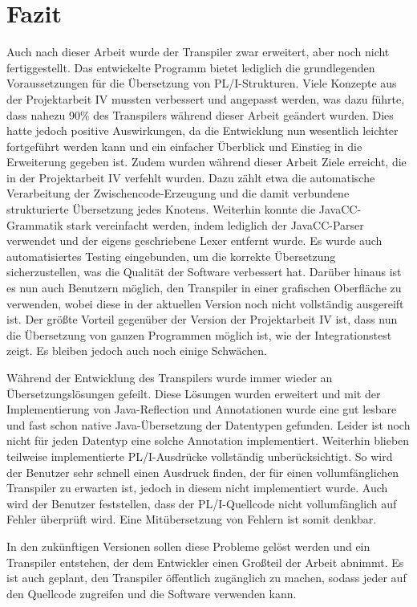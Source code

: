 \section{Fazit}
Auch nach dieser Arbeit wurde der Transpiler zwar erweitert, aber noch nicht fertiggestellt.
Das entwickelte Programm bietet lediglich die grundlegenden Voraussetzungen für die Übersetzung von PL/I-Strukturen.
Viele Konzepte aus der Projektarbeit IV mussten verbessert und angepasst werden, was dazu führte, dass nahezu 90\% des Transpilers
während dieser Arbeit geändert wurden. Dies hatte jedoch positive Auswirkungen, da die Entwicklung nun wesentlich leichter fortgeführt werden kann
und ein einfacher Überblick und Einstieg in die Erweiterung gegeben ist.
Zudem wurden während dieser Arbeit Ziele erreicht, die in der Projektarbeit IV verfehlt wurden. Dazu zählt etwa
die automatische Verarbeitung der Zwischencode-Erzeugung und die damit verbundene strukturierte Übersetzung jedes Knotens.
Weiterhin konnte die JavaCC-Grammatik stark vereinfacht werden, indem lediglich der JavaCC-Parser verwendet und der eigens geschriebene
Lexer entfernt wurde.
Es wurde auch automatisiertes Testing eingebunden, um die korrekte Übersetzung sicherzustellen, was die Qualität der Software verbessert hat.
Darüber hinaus ist es nun auch Benutzern möglich, den Transpiler in einer grafischen Oberfläche zu verwenden,
wobei diese in der aktuellen Version noch nicht vollständig ausgereift ist.
Der größte Vorteil gegenüber der Version der Projektarbeit IV ist, dass nun die Übersetzung von ganzen Programmen möglich ist, wie der Integrationstest zeigt.
Es bleiben jedoch auch noch einige Schwächen.

Während der Entwicklung des Transpilers wurde immer wieder an Übersetzungslösungen gefeilt. Diese Lösungen wurden erweitert und mit der Implementierung von Java-Reflection und Annotationen wurde eine gut lesbare und fast schon native Java-Übersetzung der Datentypen gefunden. Leider ist noch nicht für jeden Datentyp eine solche Annotation implementiert.
Weiterhin blieben teilweise implementierte PL/I-Ausdrücke vollständig unberücksichtigt. So wird der Benutzer sehr schnell einen Ausdruck finden, der für einen vollumfänglichen Transpiler zu erwarten ist, jedoch in diesem nicht implementiert wurde.
Auch wird der Benutzer feststellen, dass der PL/I-Quellcode nicht vollumfänglich auf Fehler überprüft wird. Eine Mitübersetzung von Fehlern ist somit denkbar.

In den zukünftigen Versionen sollen diese Probleme gelöst werden und ein Transpiler entstehen, der dem Entwickler einen Großteil der Arbeit abnimmt.
Es ist auch geplant, den Transpiler öffentlich zugänglich zu machen, sodass jeder auf den Quellcode zugreifen und die Software verwenden kann.

